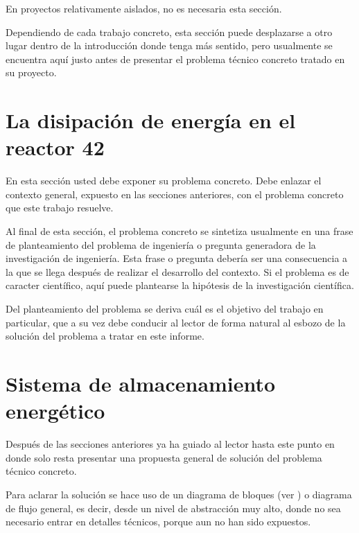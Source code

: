 En proyectos relativamente aislados, no es necesaria esta sección.

Dependiendo de cada trabajo concreto, esta sección puede desplazarse a
otro lugar dentro de la introducción donde tenga más sentido, pero
usualmente se encuentra aquí justo antes de presentar el problema
técnico concreto tratado en su proyecto.

\section{La disipación de energía en el reactor 42}

En esta sección usted debe exponer su problema concreto.  Debe enlazar
el contexto general, expuesto en las secciones anteriores, con el
problema concreto que este trabajo resuelve.

Al final de esta sección, el problema concreto se sintetiza usualmente
en una frase de planteamiento del problema de ingeniería o pregunta
generadora de la investigación de ingeniería. Esta frase o pregunta
debería ser una consecuencia a la que se llega después de realizar el
desarrollo del contexto.  Si el problema es de caracter científico,
aquí puede plantearse la hipótesis de la investigación científica.

Del planteamiento del problema se deriva cuál es el objetivo del
trabajo en particular, que a su vez debe conducir al lector de forma
natural al esbozo de la solución del problema a tratar en este
informe.

\section{Sistema de almacenamiento energético}

Después de las secciones anteriores ya ha guiado al lector hasta este
punto en donde solo resta presentar una propuesta general de solución
del problema técnico concreto.

Para aclarar la solución se hace uso de un diagrama de bloques (ver
) o diagrama de flujo general, es decir,
desde un nivel de abstracción muy alto, donde no sea necesario entrar
en detalles técnicos, porque aun no han sido expuestos.

